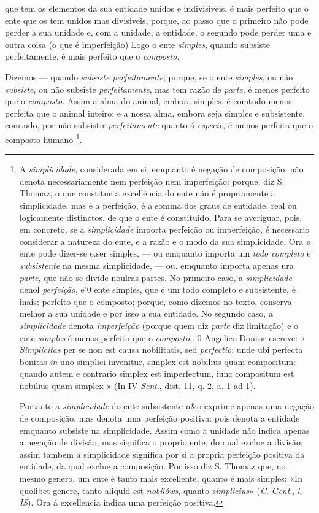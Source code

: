  que tem os elementos da sua entidade unidos e indivisiveis, é mais perfeito que o ente que os tem unidos mas divisiveis; porque, ao passo que o primeiro não pode perder a sua unidade e, com a unidade, a entidade, o segundo pode perder uma e outra coisa (o que é imperfeição) Logo o ente \emph{simples}, quando subsiste perfeitamente, é mais perfeito que o \emph{composto}.

Dizemos --- quando \emph{subsiste perfeitamente}; porque, se o ente \emph{simples}, ou não \emph{subsiste}, ou não subsiste \emph{perfeitamente}, mas tem razão de \emph{parte}, é menos perfeito que o \emph{composto}. Assim a alma do animal, embora simples, é comtudo menos perfeita que o animal inteiro; e a nossa alma, embora seja simples e subsistente, comtudo, por não subsistir \emph{perfeitamente} quanto á \emph{especie}, é menos perfeita que o composto humano \footnote{A \emph{simplicidade}, considerada em si, emquanto é negação de composição, não denota necessariamente nem perfeição nem imperfeição: porque, diz S. Thomaz, o que constitue a excellência do ente não é propriamente a simplicidade, mas é a perfeição, é a somma dos graus de entidade, real ou logicamente distinctos, de que o ente é constituido, Para se averiguar, pois, em concreto, se a \emph{simplicidade} importa perfeição ou imperfeição, é necessario considerar a natureza do ente, e a razão e o modo da sua simplicidade. Ora \emph{o} ente pode dizer-se e.ser simples, --- ou emquanto importa um \emph{todo completo} e \emph{subsistente} na mesma simplicidade, --- ou. emquanto importa apenas ura \emph{parte}, que não se divide noulras partes. No primeiro caso, a \emph{simplicidade} denol \emph{perfeição}, e'0 ente simples, que é um todo completo e subsistente, é inais: perfeito que o composto; porque, como dizemos no texto, conserva melhor a sua unidade e por isso a sua entidade. No segundo caso, a \emph{simplicidade} denota \emph{imperfeição} (porque quem diz \emph{parte} diz limitação) e o ente \emph{simples} é menos perfeito que o \emph{composto}.. 0 Angelico Doutor escreve: « \emph{Simplicitas} per se non est causa nobilitatis, sed \emph{perfectio}; unde ubi perfecta bonitas \emph{in} uno simplici invenitur, simplex est nobilius quam compositum: quando autem e contrario simplex est imperfectum, iunc compositum est nobilius quam simplex » (In IV \emph{Sent}., dist. 11, q. 2, a. 1 ad 1).\par Portanto a \emph{simplicidade} do ente subsistente n\&o exprime apenas uma negação de composição, mas denota uma perfeição positiva: pois denota a entidade emquanto subsiste na simplicidade. Assim como a unidade não indica apenas a negação de divisão, mas significa o proprio ente, do qual exclue a divisão; assim tambem a simplicidade significa por si a propria perfeição positiva da entidade, da qual exclue a composição. Por isso diz S. Thomaz que, no mesmo genero, um ente é tanto mais excellente, quanto é mais simples: «In quolibet genere, tanto aliquid est \emph{nobilóws}, quanto \emph{simplicius}» (\emph{C}. \emph{Gent}., \emph{l}, \emph{IS}). Ora á excellencia indica uma perfeição positiva.}.

